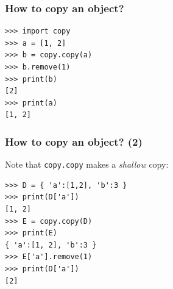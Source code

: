 \documentclass[english,serif,mathserif,xcolor=pdftex,dvipsnames,table]{beamer}
\begin{document}
%



\begin{frame}[fragile]
  \frametitle{How to copy an object?}  
  \begin{lstlisting}
>>> import copy
>>> a = [1, 2]
>>> b = copy.copy(a)
>>> b.remove(1)
>>> print(b)
[2]
>>> print(a)
[1, 2]
  \end{lstlisting}
\end{frame}


\begin{frame}[fragile]
  \frametitle{How to copy an object? (2)}  
Note that \texttt{copy.copy} makes a \emph{shallow} copy:
  \begin{lstlisting}
>>> D = { 'a':[1,2], 'b':3 }
>>> print(D['a'])
[1, 2]
>>> E = copy.copy(D)
>>> print(E)
{ 'a':[1, 2], 'b':3 }
>>> E['a'].remove(1)
>>> print(D['a'])
[2]    
  \end{lstlisting}
\end{frame}
\end{document}
